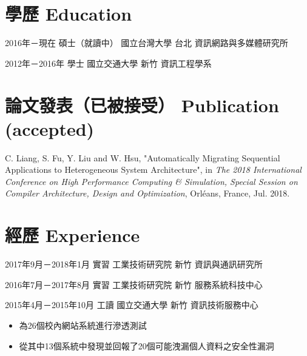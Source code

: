 \documentclass[11pt,a4paper,sans,english]{moderncv}
\begin{document}
\makecvtitle

\section{{\zh 學歷} Education}
    \cventry
        {\zh 2016年－現在} %
        {\zh 碩士（就讀中）} %
        {\zh 國立台灣大學} %
        {\zh 台北} %
        {\zh 資訊網路與多媒體研究所} %
        {}

    \cventry
        {\zh 2012年－2016年}
        {\zh 學士}
        {\zh 國立交通大學}
        {\zh 新竹}
        {\zh 資訊工程學系}
        {%
        }
        
\section{{\zh 論文發表（已被接受） }Publication (accepted)}
    C. Liang, S. Fu, Y. Liu and W. Hsu, "Automatically Migrating Sequential Applications to Heterogeneous System Architecture", in \textit{The 2018 International Conference on High Performance Computing \& Simulation, Special Session on Compiler Architecture, Design and Optimization}, Orléans, France, Jul. 2018.

\section{{\zh 經歷} Experience}
    \cventry
        {\zh 2017年9月－2018年1月} %
        {\zh 實習} %
        {\zh 工業技術研究院} %
        {\zh 新竹} %
        {\zh 資訊與通訊研究所} %
        {} %

    \cventry
        {\zh 2016年7月－2017年8月}
        {\zh 實習}
        {\zh 工業技術研究院}
        {\zh 新竹}
        {\zh 服務系統科技中心}
        {}
        
    \cventry
        {\zh 2015年4月－2015年10月}
        {\zh 工讀}
        {\zh 國立交通大學}
        {\zh 新竹}
        {\zh 資訊技術服務中心}
        {\begin{itemize}
        \item \zh 為26個校內網站系統進行滲透測試
        \item \zh 從其中13個系統中發現並回報了20個可能洩漏個人資料之安全性漏洞
        \end{itemize}}
        
\end{document}
